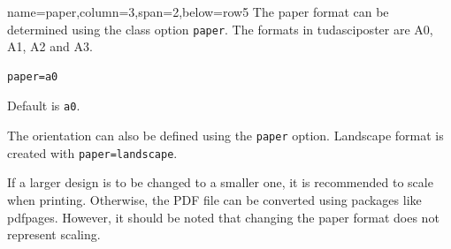 \documentclass[
	english,%
	accentcolor=9c,%
]{tudasciposter}
\newcommand*{\code}[1]{\texttt{#1}}
\newcommand*{\pkg}[1]{\textsf{#1}}
\newcommand*{\cls}[1]{\textsf{#1}}
\begin{document}
\begin{tcbposter}[
	poster={
		columns=4,
		rows=7,
		spacing=1cm,
	},]
\begin{posterboxenv}[title=Paper size]{name=paper,column=3,span=2,below=row5}
	The paper format can be determined using the class option \code{paper}. The formats in \cls{tudasciposter} are A0, A1, A2 and A3.
\begin{verbatim}
paper=a0
\end{verbatim}
	Default is \code{a0}.

	The orientation can also be defined using the \code{paper} option.
	Landscape format is created with \code{paper=landscape}.

	If a larger design is to be changed to a smaller one, it is recommended to scale when printing. Otherwise, the PDF file can be converted using packages like \pkg{pdfpages}.
	However, it should be noted that changing the paper format does not represent scaling.
\end{posterboxenv}

\end{tcbposter}
\end{document}
